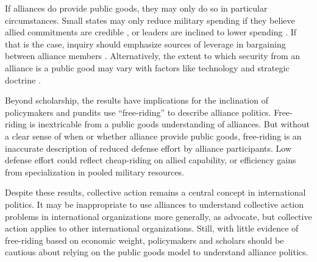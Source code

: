 \documentclass[12pt]{article}
\begin{document}
If alliances do provide public goods, they may only do so in particular circumstances. 
Small states may only reduce military spending if they believe allied commitments are credible \citep{Goldstein1995, DigiuseppePoast2016}, or leaders are inclined to lower spending \citep{Fuhrmann2020}. 
If that is the case, inquiry should emphasize sources of leverage in bargaining between alliance members \citep{Morrow1991, Norrlof2010, Brooksetal2013, Johnson2015, Kim2016}. 
Alternatively, the extent to which security from an alliance is a public good may vary with factors like technology and strategic doctrine \citep{SandlerHartley2001}. 


Beyond scholarship, the results have implications for the inclination of policymakers and pundits use ``free-riding'' to describe alliance politics. 
Free-riding is inextricable from a public goods understanding of alliances.
But without a clear sense of when or whether alliance provide public goods, free-riding is an inaccurate description of reduced defense effort by alliance participants.  
Low defense effort could reflect cheap-riding on allied capability, or efficiency gains from specialization in pooled military resources. 


Despite these results, collective action remains a central concept in international politics.   
It may be inappropriate to use alliances to understand collective action problems in international organizations more generally, as \citet[pg. 266-7]{OlsonZeckhauser1966} advocate, but collective action applies to other international organizations. 
Still, with little evidence of free-riding based on economic weight, policymakers and scholars should be cautious about relying on the public goods model to understand alliance politics.  



\singlespace


 
\end{document}
